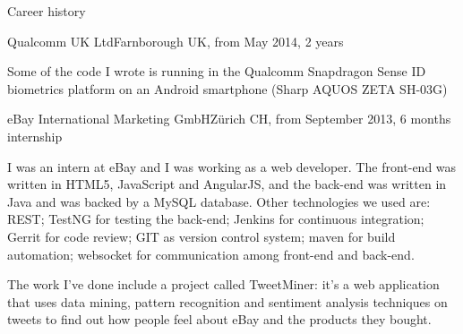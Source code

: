 \documentclass{resume}
\begin{document}
\begin{rSection}{Career history}
\begin{rSubsection}{Qualcomm UK Ltd}{Farnborough UK, from May 2014, 2 years}{}{}

	  
	  
	\item[]
	  Some of the code I wrote is running in the Qualcomm Snapdragon Sense ID biometrics platform on
	  an Android smartphone (Sharp AQUOS ZETA SH-03G) 
    \end{rSubsection}

    \begin{rSubsection}{eBay International Marketing GmbH}{Z\"urich CH, from September 2013, 6 months internship}{}{}
	 \item[]  
	    I was an intern at eBay and I was working as a web developer. %
	    The front-end was written in HTML5, JavaScript and AngularJS, and
	    the back-end was written in Java and was backed by a MySQL database. 
	    Other technologies we used are: 
	        REST;
	    	TestNG for testing the back-end; 
		Jenkins for continuous integration; 
		Gerrit for code review; 
	    	GIT as version control system; 
		maven for build automation;
		websocket for communication among front-end and back-end.	  
	  \item[]
	    The work I've done include a project called TweetMiner:
	    it's a web application that uses data mining, pattern recognition and sentiment analysis techniques on tweets to find out how people feel about eBay and the products they bought. 
    \end{rSubsection}


\end{rSection}
\end{document}

